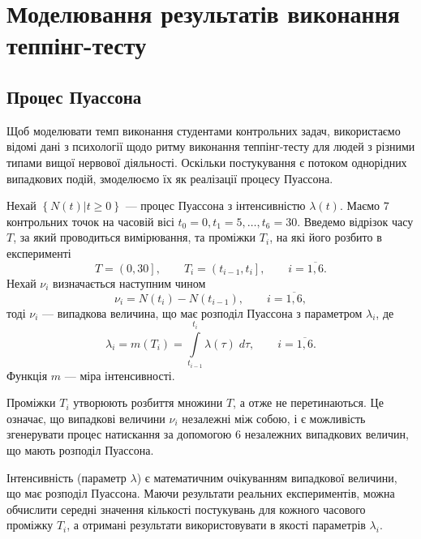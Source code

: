 \section{Моделювання результатів виконання теппінг-тесту}

\subsection{Процес Пуассона}
Щоб моделювати темп виконання студентами контрольних задач, використаємо
відомі дані з психології щодо ритму виконання теппінг-тесту для людей
з різними типами вищої нервової діяльності.
Оскільки постукування є потоком однорідних випадкових подій, змоделюємо їх
як реалізації процесу Пуассона.

Нехай $\left\{ N\left( t \right) \vert t \ge 0 \right\}$ --- процес Пуассона з
інтенсивністю $\lambda\left( t \right)$.
Маємо $7$ контрольних точок на часовій вісі $t_0 = 0, t_1 = 5, \dots, t_6 = 30$.
Введемо відрізок часу $T$, за який проводиться вимірювання,
та проміжки $T_i$, на які його розбито в експерименті
\begin{equation*}
  T = \left( 0, 30 \right], \qquad
  T_i = \left( t_{i-1}, t_i \right], \qquad
  i = \overline{1, 6}.
\end{equation*}
Нехай $\nu_i$ визначається наступним чином
\begin{equation*}
  \nu_i = N\left( t_i \right) - N\left( t_{i-1} \right),
  \qquad i = \overline{1,6},
\end{equation*}
тоді $\nu_i$ --- випадкова величина, що має розподіл Пуассона з параметром
$\lambda_i$, де \cite{Bulinsky:2003}
\begin{equation*}
  \lambda_i
  = m\left( T_i \right)
  = \int\limits_{t_{i-1}}^{t_i} \lambda\left( \tau \right) \; d\tau, \qquad
  i = \overline{1, 6}.
\end{equation*}
Функція $m$ --- міра інтенсивності. \cite{Kingman:1992}

Проміжки $T_i$ утворюють розбиття множини $T$, а отже не перетинаються.
Це означає, що випадкові величини $\nu_i$ незалежні між собою,
і є можливість згенерувати процес натискання за допомогою $6$ незалежних
випадкових величин, що мають розподіл Пуассона.

Інтенсивність (параметр $\lambda$) є математичним очікуванням випадкової
величини, що має розподіл Пуассона.
Маючи результати реальних експериментів, можна обчислити середні значення
кількості постукувань для кожного часового проміжку $T_i$, а отримані
результати використовувати в якості параметрів $\lambda_i$.

